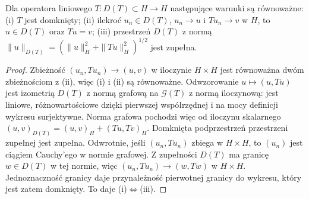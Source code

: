 \begin{lemat}
\label{lem:pde12-graph}
Dla operatora liniowego $T:D(T)\subset H\to H$
następujące warunki są równoważne:
(i) $T$ jest domknięty; (ii) ilekroć $u_n\in D(T)$,
$u_n\to u$ i $Tu_n\to v$ w $H$, to $u\in D(T)$ oraz $Tu=v$;
(iii) przestrzeń $D(T)$ z normą
$\|u\|_{D(T)}=(\|u\|_H^2+\|Tu\|_H^2)^{1/2}$ jest zupełna.
\end{lemat}
\begin{proof}
Zbieżność $(u_n,Tu_n)\to(u,v)$ w iloczynie $H\times H$
jest równoważna dwóm zbieżnościom z (ii), więc (i) i (ii)
są równoważne. Odwzorowanie $u\mapsto(u,Tu)$ jest izometrią
$D(T)$ z normą grafową na $\mathcal G(T)$ z normą iloczynową:
jest liniowe, różnowartościowe dzięki pierwszej współrzędnej
i na mocy definicji wykresu surjektywne. Norma grafowa
pochodzi więc od iloczynu skalarnego
$(u,v)_{D(T)}=(u,v)_H+(Tu,Tv)_H$.
Domknięta podprzestrzeń przestrzeni zupełnej jest zupełna.
Odwrotnie, jeśli $(u_n,Tu_n)$ zbiega w $H\times H$,
to $(u_n)$ jest ciągiem Cauchy'ego w normie grafowej.
Z zupełności $D(T)$ ma granicę $w\in D(T)$ w tej normie,
więc $(u_n,Tu_n)\to(w,Tw)$ w $H\times H$.
Jednoznaczność granicy daje przynależność pierwotnej
granicy do wykresu, który jest zatem domknięty. To daje (i)$\Leftrightarrow$(iii).
\end{proof}

